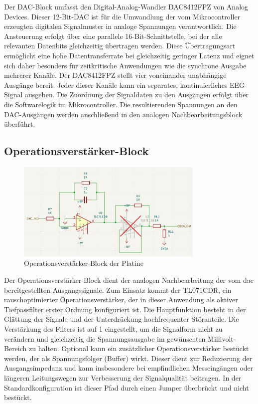 Der DAC-Block umfasst den Digital-Analog-Wandler DAC8412FPZ von Analog Devices. Dieser 12-Bit-DAC ist für die Umwandlung der vom Mikrocontroller erzeugten digitalen Signalmuster in analoge Spannungen verantwortlich. 
Die Ansteuerung erfolgt über eine parallele 16-Bit-Schnittstelle, bei der alle relevanten Datenbits gleichzeitig übertragen werden. Diese Übertragungsart ermöglicht eine hohe Datentransferrate bei gleichzeitig geringer Latenz und eignet sich daher besonders für zeitkritische Anwendungen wie die synchrone Ausgabe mehrerer Kanäle.
Der DAC8412FPZ stellt vier voneinander unabhängige Ausgänge bereit. Jeder dieser Kanäle kann ein separates, kontinuierliches EEG-Signal ausgeben. Die Zuordnung der Signaldaten zu den Ausgängen erfolgt über die Softwarelogik im Mikrocontroller. Die resultierenden Spannungen an den DAC-Ausgängen werden anschließend in den analogen Nachbearbeitungsblock überführt.


\subsection{Operationsverstärker-Block}

\begin{figure}[H]
    \centering
    \includegraphics[width=0.8\textwidth]{bilder/Operationsverstaerker_Block.png}
    \caption{Operationsverstärker-Block der Platine}
    \label{fig:operationsverstaerker_block}
\end{figure}

Der Operationsverstärker-Block dient der analogen Nachbearbeitung der vom \gls{dac} bereitgestellten Ausgangssignale. Zum Einsatz kommt der TL071CDR, ein rauschoptimierter Operationsverstärker, der in dieser Anwendung als aktiver Tiefpassfilter erster Ordnung konfiguriert ist. Die Hauptfunktion besteht in der Glättung der Signale und der Unterdrückung hochfrequenter Störanteile.
Die Verstärkung des Filters ist auf 1 eingestellt, um die Signalform nicht zu verändern und gleichzeitig die Spannungsausgabe im gewünschten Millivolt-Bereich zu halten.
Optional kann ein zusätzlicher Operationsverstärker bestückt werden, der als Spannungsfolger (Buffer) wirkt. Dieser dient zur Reduzierung der Ausgangsimpedanz und kann insbesondere bei empfindlichen Messeingängen oder längeren Leitungswegen zur Verbesserung der Signalqualität beitragen. In der Standardkonfiguration ist dieser Pfad durch einen Jumper überbrückt und nicht bestückt.


